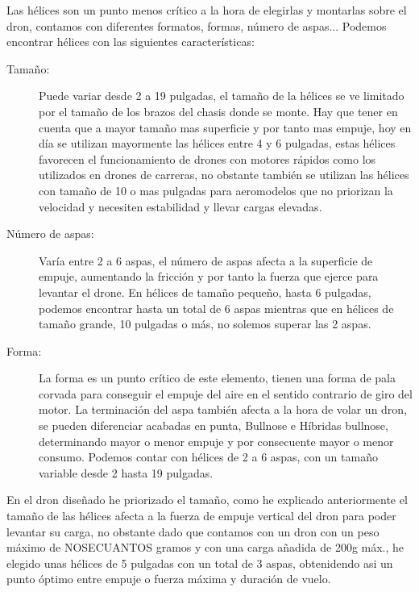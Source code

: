 
 Las hélices son un punto menos crítico a la hora de elegirlas y montarlas sobre el dron, contamos con diferentes formatos, formas, número de aspas...
 Podemos encontrar hélices con las siguientes características:
 \begin{description}
        \item[Tamaño:] Puede variar desde 2 a 19 pulgadas, el tamaño de la hélices se ve limitado por el tamaño de los brazos del chasis donde se monte. Hay que tener en cuenta que a mayor tamaño mas superficie y por tanto mas empuje, hoy en día se utilizan mayormente las hélices entre 4 y 6 pulgadas, estas hélices favorecen el funcionamiento de drones con motores rápidos como los utilizados en drones de carreras, no obstante también se utilizan las hélices con tamaño de 10 o mas pulgadas para aeromodelos que no priorizan la velocidad y necesiten estabilidad y llevar cargas elevadas.
 		\item[Número de aspas:] Varía entre 2 a 6 aspas, el número de aspas afecta a la superficie de empuje, aumentando la fricción y por tanto la fuerza que ejerce para levantar el drone. En hélices de tamaño pequeño, hasta 6 pulgadas, podemos encontrar hasta un total de 6 aspas mientras que en hélices de tamaño grande, 10 pulgadas o más, no solemos superar las 2 aspas.
 		\item[Forma:] La forma es un punto crítico de este elemento, tienen una forma de pala corvada para conseguir el empuje del aire en el sentido contrario de giro del motor. La terminación del aspa también afecta a la hora de volar un dron, se pueden diferenciar acabadas en punta,  Bullnose e Híbridas bullnose, determinando mayor o menor empuje y por consecuente mayor o menor consumo.
 Podemos contar con hélices de 2 a 6 aspas, con un tamaño variable desde 2  hasta 19 pulgadas.
 
 \end{description}
 
 En el dron diseñado he priorizado el tamaño, como he explicado anteriormente el tamaño de las hélices afecta a la fuerza de empuje vertical del dron para poder levantar su carga, no obstante dado que contamos con un dron con un peso máximo de NOSECUANTOS gramos y con una carga añadida de 200g máx., he elegido unas hélices de 5 pulgadas con un total de 3 aspas, obtenidendo asi un punto óptimo entre empuje o fuerza máxima y duración de vuelo.
 

 